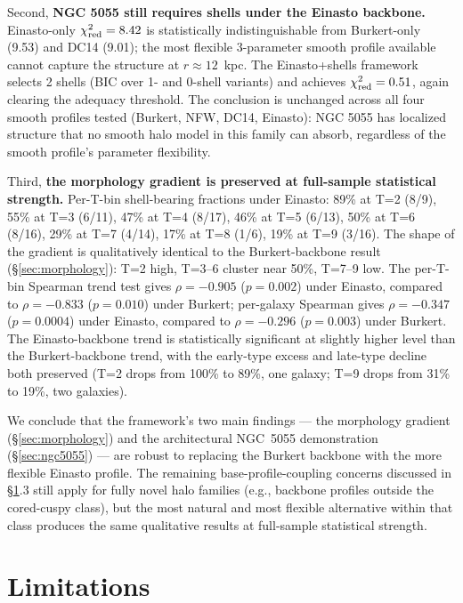 Second, \textbf{NGC 5055 still requires shells under the Einasto backbone.} Einasto-only $\chi^2_{\rm red} = 8.42$ is statistically indistinguishable from Burkert-only (9.53) and DC14 (9.01); the most flexible 3-parameter smooth profile available cannot capture the structure at $r \approx 12$~kpc. The Einasto+shells framework selects 2 shells (BIC over 1- and 0-shell variants) and achieves $\chi^2_{\rm red} = 0.51$, again clearing the adequacy threshold. The conclusion is unchanged across all four smooth profiles tested (Burkert, NFW, DC14, Einasto): NGC 5055 has localized structure that no smooth halo model in this family can absorb, regardless of the smooth profile's parameter flexibility.

Third, \textbf{the morphology gradient is preserved at full-sample statistical strength.} Per-T-bin shell-bearing fractions under Einasto: 89\% at T=2 (8/9), 55\% at T=3 (6/11), 47\% at T=4 (8/17), 46\% at T=5 (6/13), 50\% at T=6 (8/16), 29\% at T=7 (4/14), 17\% at T=8 (1/6), 19\% at T=9 (3/16). The shape of the gradient is qualitatively identical to the Burkert-backbone result (\S\ref{sec:morphology}): T=2 high, T=3--6 cluster near 50\%, T=7--9 low. The per-T-bin Spearman trend test gives $\rho = -0.905$ ($p = 0.002$) under Einasto, compared to $\rho = -0.833$ ($p = 0.010$) under Burkert; per-galaxy Spearman gives $\rho = -0.347$ ($p = 0.0004$) under Einasto, compared to $\rho = -0.296$ ($p = 0.003$) under Burkert. The Einasto-backbone trend is statistically significant at slightly higher level than the Burkert-backbone trend, with the early-type excess and late-type decline both preserved (T=2 drops from 100\% to 89\%, one galaxy; T=9 drops from 31\% to 19\%, two galaxies).

We conclude that the framework's two main findings --- the morphology gradient (\S\ref{sec:morphology}) and the architectural NGC~5055 demonstration (\S\ref{sec:ngc5055}) --- are robust to replacing the Burkert backbone with the more flexible Einasto profile. The remaining base-profile-coupling concerns discussed in \S\ref{sec:limitations}.3 still apply for fully novel halo families (e.g., backbone profiles outside the cored-cuspy class), but the most natural and most flexible alternative within that class produces the same qualitative results at full-sample statistical strength.

\section{Limitations}
\label{sec:limitations}

